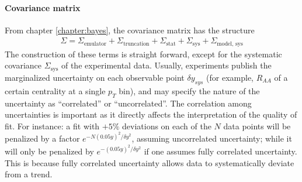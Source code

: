 \paragraph{Covariance matrix} 
From chapter \ref{chapter:bayes}, the covariance matrix has the structure
\begin{eqnarray}
\Sigma = \Sigma_{\textrm{emulator}} + \Sigma_{\textrm{truncation}} + \Sigma_{\textrm{stat}} + \Sigma_{\textrm{sys}} + \Sigma_{\textrm{model, sys}} 
\end{eqnarray}
The construction of these terms is straight forward, except for the systematic covariance $\Sigma_{\textrm{sys}}$ of the experimental data.
Usually, experiments publish the marginalized uncertainty on each observable point $\delta y_{sys}$ (for example, $R_{AA}$ of a certain centrality at a single $p_T$ bin), and may specify the nature of the uncertainty as ``correlated'' or ``uncorrelated''.
The correlation among uncertainties is important as it directly affects the interpretation of the quality of fit.
For instance: a fit with $+5\%$ deviations on each of the $N$ data points will be penalized by a factor $e^{-N(0.05 y)^2/\delta y^2}$, assuming uncorrelated uncertainty; while it will only be penalized by $e^{-(0.05 y)^2/\delta y^2}$ if one assumes fully correlated uncertainty.
This is because fully correlated uncertainty allows data to systematically deviate from a trend.

